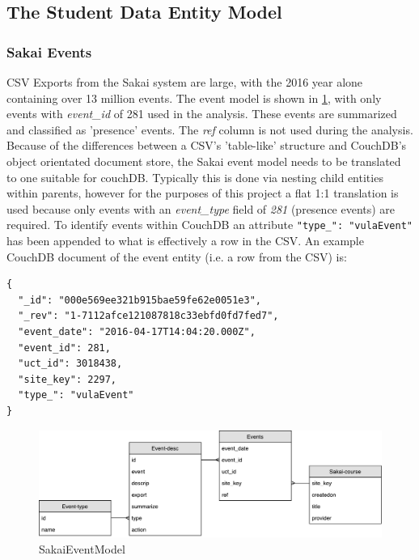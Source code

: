 \subsection{The Student Data Entity Model}

\subsubsection*{Sakai Events}
CSV Exports from the Sakai system are large, with the 2016 year alone containing over 13 million events. The event model is shown in \ref{SakaiEventModel}, with only events with \textit{event\_id} of 281 used in the analysis. These events are summarized and classified as 'presence' events. The \textit{ref} column is not used during the analysis. Because of the differences between a CSV's 'table-like' structure and CouchDB's object orientated document store, the Sakai event model needs to be translated to one suitable for couchDB. Typically this is done via nesting child entities within parents, however for the purposes of this project a flat 1:1 translation is used because only events with an \textit{event_type} field of \textit{281} (presence events) are required. To identify events within CouchDB an attribute \texttt{{"type_": "vulaEvent"}} has been appended to what is effectively a row in the CSV. An example CouchDB document of the event entity (i.e. a row from the CSV) is:

\begin{verbatim}
{
  "_id": "000e569ee321b915bae59fe62e0051e3",
  "_rev": "1-7112afce121087818c33ebfd0fd7fed7",
  "event_date": "2016-04-17T14:04:20.000Z",
  "event_id": 281,
  "uct_id": 3018438,
  "site_key": 2297,
  "type_": "vulaEvent"
}
\end{verbatim}

\begin{figure}[h]
    \centering
    \includegraphics[scale=0.4]{./resources/figures/SakaiEvents}
    \caption[SakaiEventModel]{SakaiEventModel}
    \label{SakaiEventModel}
\end{figure}

